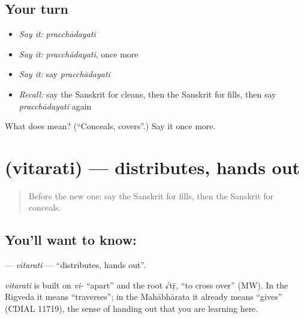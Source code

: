 \subsection*{Your turn}
\begin{itemize}
\raggedright
  \item \emph{Say it:} \emph{pracchādayati}
  \item \emph{Say it:} \emph{pracchādayati}, once more
  \item \emph{Say it:} say \emph{pracchādayati}
  \item \emph{Recall:} say the Sanskrit for cleans, then the Sanskrit for fills, then say \emph{pracchādayati} again
\end{itemize}

\begin{tcolorbox}[breakable,colback=teal!4,colframe=teal!35!black,title={Before you move on}]
What does  mean? (\textquotedblleft{}Conceals, covers\textquotedblright{}.) Say it once more.
\end{tcolorbox}
\section[\texorpdfstring{\sk{वितरति} (vitarati)}{वितरति (vitarati)}]{ (vitarati) — distributes, hands out}

\label{lesson:SA-C177-vitarati}



\begin{quote}
Before the new one: say the Sanskrit for fills, then the Sanskrit for conceals.
\end{quote}

\subsection*{You'll want to know: }
\textbf{} — \emph{vitarati} — \textquotedblleft{}distributes, hands out\textquotedblright{}.

\begin{cousinweb}
\emph{vitarati} is built on \emph{vi-} \textquotedblleft{}apart\textquotedblright{} and the root √tṝ, \textquotedblleft{}to cross over\textquotedblright{} (MW). In the Rigveda it means \textquotedblleft{}traverses\textquotedblright{}; in the Mahābhārata it already means \textquotedblleft{}gives\textquotedblright{} (CDIAL 11719), the sense of handing out that you are learning here.
\end{cousinweb}

